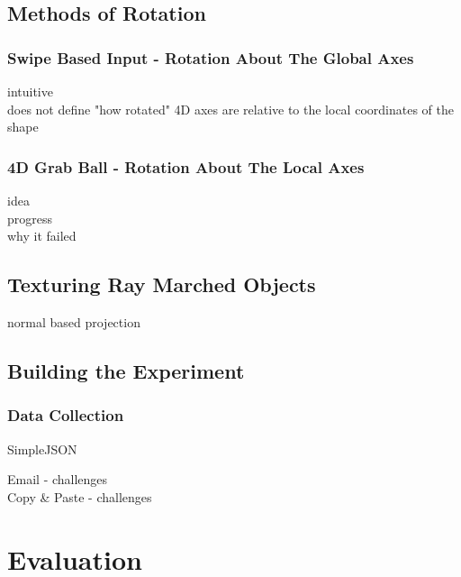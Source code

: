 \documentclass{l4proj}
\begin{document}
\section{Methods of Rotation}

\subsection{Swipe Based Input - Rotation About The Global Axes}

intuitive\\
does not define "how rotated" 4D axes are relative to the local coordinates of the shape

\subsection{4D Grab Ball - Rotation About The Local Axes}

idea\\
progress\\
why it failed

\section{Texturing Ray Marched Objects}

normal based projection

\section{Building the Experiment}

\subsection{}

\subsection{Data Collection}

SimpleJSON \citep{bunny83_simplejson_nodate}

Email - challenges\\
Copy \& Paste - challenges

\chapter{Evaluation} 
\end{document}
